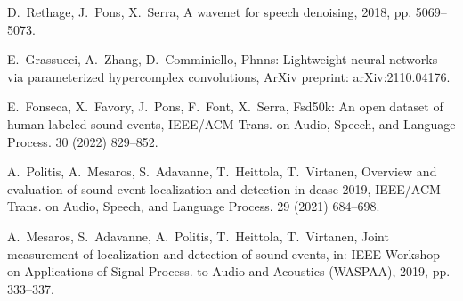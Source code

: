 \documentclass[3p, preprint, twocolumn]{elsarticle}
\begin{document}
\begin{thebibliography}{10}
D.~Rethage, J.~Pons, X.~Serra, A wavenet for speech denoising, 2018, pp.
  5069--5073.

E.~Grassucci, A.~Zhang, D.~Comminiello, Phnns: Lightweight neural networks via
  parameterized hypercomplex convolutions, ArXiv preprint: arXiv:2110.04176.

E.~Fonseca, X.~Favory, J.~Pons, F.~Font, X.~Serra, Fsd50k: An open dataset of
  human-labeled sound events, {IEEE/ACM} Trans. on Audio, Speech, and Language
  Process. 30 (2022) 829--852.

A.~Politis, A.~Mesaros, S.~Adavanne, T.~Heittola, T.~Virtanen, Overview and
  evaluation of sound event localization and detection in dcase 2019,
  {IEEE/ACM} Trans. on Audio, Speech, and Language Process. 29 (2021) 684--698.

A.~Mesaros, S.~Adavanne, A.~Politis, T.~Heittola, T.~Virtanen, Joint
  measurement of localization and detection of sound events, in: {IEEE}
  Workshop on Applications of Signal Process. to Audio and Acoustics
  ({WASPAA}), 2019, pp. 333--337.

\end{thebibliography}
\end{document}
